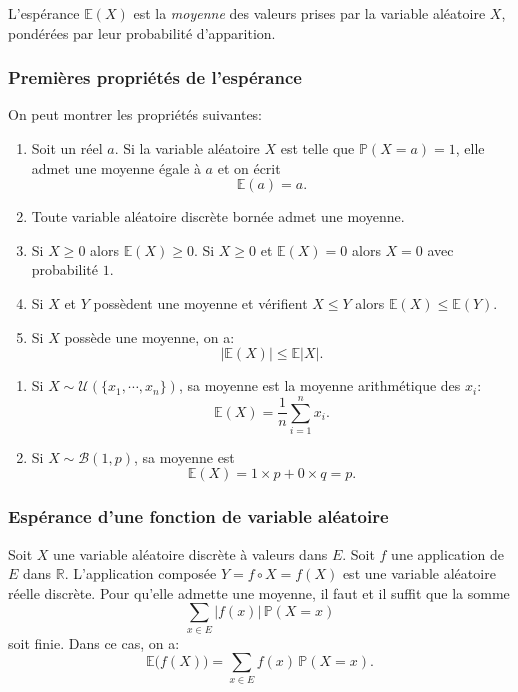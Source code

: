 L'espérance $\mathbb{E} (X)$ est la \emph{moyenne} des valeurs prises par la variable aléatoire $X$, pondérées par leur probabilité d'apparition.
\pagebreak[5]
\subsubsection{Premières propriétés de l'espérance}

\begin{proposition}
On peut montrer les propriétés suivantes:
\begin{enumerate}[label=$(\roman*)$]
	\item Soit un réel $a$. Si la variable aléatoire $X$ est telle que $\mathbb{P}(X=a)=1$, elle admet une moyenne égale à $a$ et on écrit
	\[\mathbb{E} (a) = a .\]
	\item Toute variable aléatoire discrète bornée admet une moyenne.
	\item Si $X \geq 0$ alors $\mathbb{E} (X) \geq 0$. Si $X \geq 0$ et $\mathbb{E} (X) =0$ alors $X=0$ avec probabilité $1$.
	\item Si $X$ et $Y$ possèdent une moyenne et vérifient $X \leq Y$ alors $\mathbb{E} (X) \leq \mathbb{E} (Y)$.
	\item Si $X$ possède une moyenne, on a:
		\[ 
			|\mathbb{E} (X) | \leq \mathbb{E} |X|.
		\]
\end{enumerate}
\end{proposition}
\sld{\vfill\pagebreak[5]}%
\begin{exemple}
	\begin{enumerate}
		\item Si $X \sim \mathcal{U}(\{x_1,\cdots,x_n\})$, sa moyenne est la moyenne arithmétique des $x_i$:
			\[
				\mathbb{E} (X) = \frac{1}{n} \sum_{i=1}^n x_i .
			\]
		\item Si $X \sim \mathcal{B} (1, p)$, sa moyenne est 
			\[
				\mathbb{E} (X) = 1 \times p + 0 \times q = p .
			\]
	\end{enumerate}
\end{exemple}
 \sld{\vfill\pagebreak[5]}%
\subsubsection{Espérance d'une fonction de variable aléatoire}

\begin{theorem}
Soit $X$ une variable aléatoire discrète à valeurs dans $E$. Soit $f$ une application de $E$ dans $\mathbb{R}$. L'application composée $Y=f \circ X = f(X)$ est une variable aléatoire réelle discrète. Pour qu'elle admette une moyenne, il faut et il suffit que la somme 
\[  
	\sum_{x \in E} |f(x)| \, \mathbb{P}(X=x) 
\]
soit finie. Dans ce cas, on a:
\[
	\mathbb{E} \big( f(X) \big) = \sum_{x \in E} f(x) \, \mathbb{P}(X=x) .
\]
\end{theorem}

